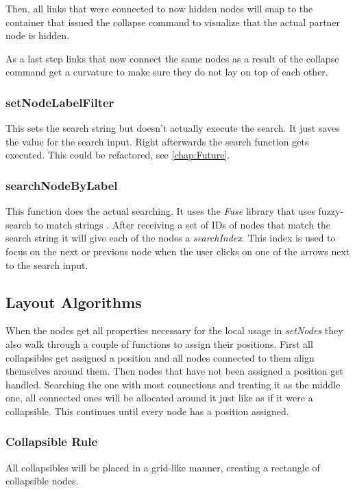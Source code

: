Then, all links that were connected to now hidden nodes will snap to the container that issued the collapse command to visualize that the actual partner node is hidden.

As a last step links that now connect the same nodes as a result of the collapse command get a curvature to make sure they do not lay on top of each other.

\subsubsection{setNodeLabelFilter}
This sets the search string but doesn't actually execute the search. It just saves the value for the search input. Right afterwards the search function gets executed. This could be refactored, see \autoref{chap:Future}.

\subsubsection{searchNodeByLabel}
This function does the actual searching. It uses the \emph{Fuse} library that uses fuzzy-search to match strings \cite{Fuze}. After receiving a set of IDs of nodes that match the search string it will give each of the nodes a \emph{searchIndex}. This index is used to focus on the next or previous node when the user clicks on one of the arrows next to the search input.


\subsection{Layout Algorithms}
When the nodes get all properties necessary for the local usage in \emph{setNodes} they also walk through a couple of functions to assign their positions. First all collapsibles get assigned a position and all nodes connected to them align themselves around them. Then nodes that have not been assigned a position get handled. Searching the one with most connections and treating it as the middle one, all connected ones will be allocated around it just like as if it were a collapsible. This continues until every node has a position assigned.

\newpage
\subsubsection{Collapsible Rule}
All collapsibles will be placed in a grid-like manner, creating a rectangle of collapsible nodes.

